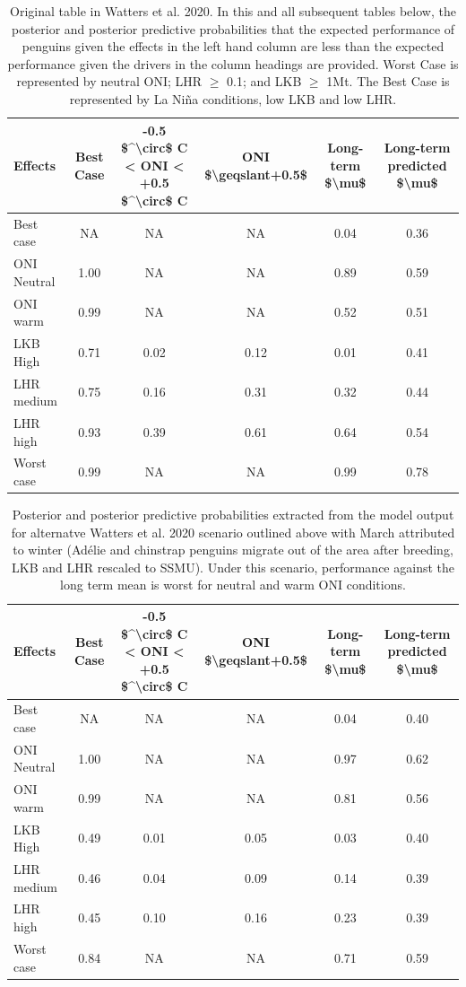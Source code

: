 \documentclass[]{elsarticle} %
\begin{document}
\begin{landscape}

\begin{longtable}[t]{lccccc}
\caption{\label{tab:Table 1 Scenario Original}Original table in Watters et al. 2020.  In this and all subsequent tables below, the posterior and posterior predictive probabilities that the expected performance of penguins given the effects in the left hand column are less than the expected performance given the drivers in the column headings are provided. Worst Case is represented by neutral ONI; LHR  $\geqslant$ 0.1; and LKB $\geqslant$ 1Mt.  The Best Case is represented by La Niña conditions, low LKB and low LHR.}\\
\toprule
Effects & Best Case & -0.5 \$\textasciicircum{}\textbackslash{}circ\$ C < ONI < +0.5 \$\textasciicircum{}\textbackslash{}circ\$ C & ONI \$\textbackslash{}geqslant+0.5\$ & Long-term \$\textbackslash{}mu\$ & Long-term predicted \$\textbackslash{}mu\$\\
\midrule
Best case & NA & NA & NA & 0.04 & 0.36\\
ONI Neutral & 1.00 & NA & NA & 0.89 & 0.59\\
ONI warm & 0.99 & NA & NA & 0.52 & 0.51\\
LKB High & 0.71 & 0.02 & 0.12 & 0.01 & 0.41\\
LHR medium & 0.75 & 0.16 & 0.31 & 0.32 & 0.44\\
\addlinespace
LHR high & 0.93 & 0.39 & 0.61 & 0.64 & 0.54\\
Worst case & 0.99 & NA & NA & 0.99 & 0.78\\
\bottomrule
\end{longtable}

\begin{longtable}[t]{lccccc}
\caption{\label{tab:Table 1 Scenario 37a}Posterior and posterior predictive probabilities extracted from the model output for alternatve Watters et al. 2020 scenario outlined above with March attributed to winter (Adélie and chinstrap penguins migrate out of the area after breeding, LKB and LHR rescaled to SSMU). Under this scenario, performance against the long term mean is worst for neutral and warm ONI conditions.}\\
\toprule
Effects & Best Case & -0.5 \$\textasciicircum{}\textbackslash{}circ\$ C < ONI < +0.5 \$\textasciicircum{}\textbackslash{}circ\$ C & ONI \$\textbackslash{}geqslant+0.5\$ & Long-term \$\textbackslash{}mu\$ & Long-term predicted \$\textbackslash{}mu\$\\
\midrule
Best case & NA & NA & NA & 0.04 & 0.40\\
ONI Neutral & 1.00 & NA & NA & 0.97 & 0.62\\
ONI warm & 0.99 & NA & NA & 0.81 & 0.56\\
LKB High & 0.49 & 0.01 & 0.05 & 0.03 & 0.40\\
LHR medium & 0.46 & 0.04 & 0.09 & 0.14 & 0.39\\
\addlinespace
LHR high & 0.45 & 0.10 & 0.16 & 0.23 & 0.39\\
Worst case & 0.84 & NA & NA & 0.71 & 0.59\\
\bottomrule
\end{longtable}

\end{landscape}
\end{document}
